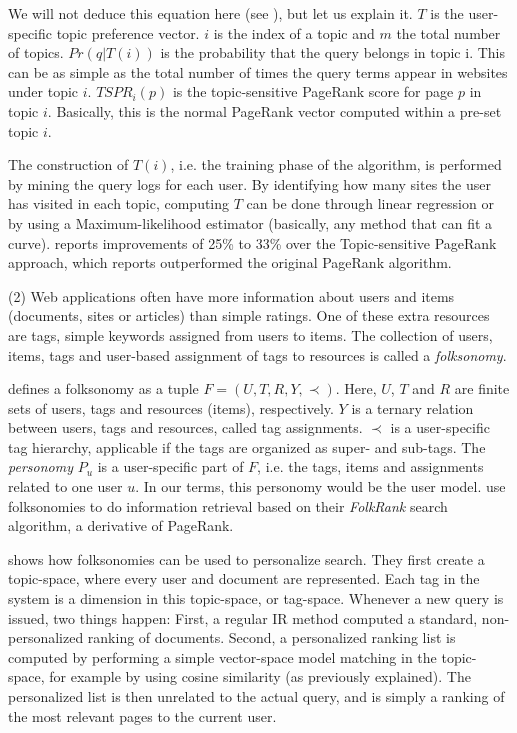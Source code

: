 We will not deduce this equation here (see \citet[p5]{Qiu2006}), but let us explain it. 
$T$ is the user-specific topic preference vector.
$i$ is the index of a topic and $m$ the total number of topics.
$Pr(q|T(i))$ is the probability that the query belongs in topic i.
This can be as simple as the total number of times the query terms appear in websites under topic $i$.
$TSPR_i(p)$ is the topic-sensitive PageRank score for page $p$ in topic $i$. Basically, this is 
the normal PageRank vector computed within a pre-set topic $i$.

The construction of $T(i)$, i.e. the training phase of the algorithm, is performed by mining the query logs for each user.
By identifying how many sites the user has visited in each topic, computing $T$ can be done through linear regression or
by using a Maximum-likelihood estimator (basically, any method that can fit a curve).
\citet[p10]{Qiu2006} reports improvements of 25\% to 33\% over the Topic-sensitive PageRank approach, which 
\citet{Haveliwala2003} reports outperformed the original PageRank algorithm.


(2) Web applications often have more information about users and items (documents, sites or articles) 
than simple ratings. One of these extra resources are tags, simple keywords assigned from users to items. 
The collection of users, items, tags and user-based assignment of tags to resources is called a \emph{folksonomy}.

\cite{Hotho} defines a folksonomy as a tuple $F = (U,T,R,Y,\prec)$. 
Here, $U$, $T$ and $R$ are finite sets of users, tags and resources (items), respectively. 
$Y$ is a ternary relation between users, tags and resources, called tag assignments. 
$\prec$ is a user-specific tag hierarchy, applicable if the tags are organized as super- and sub-tags. 
The \emph{personomy} $P_u$ is a user-specific part of $F$, 
i.e. the tags, items and assignments related to one user $u$. 
In our terms, this personomy would be the user model. 
\citeauthor{Hotho} use folksonomies to do information retrieval based on their 
\emph{FolkRank} search algorithm, a derivative of PageRank. 

\cite{Bao2007} shows how folksonomies can be used to personalize search.
They first create a topic-space, where every user and document are represented.
Each tag in the system is a dimension in this topic-space, or tag-space.
Whenever a new query is issued, two things happen: First, a regular IR method
computed a standard, non-personalized ranking of documents.
Second, a personalized ranking list is computed by performing a simple
vector-space model matching in the topic-space, for example by using
cosine similarity (as previously explained). The personalized list
is then unrelated to the actual query, and is simply a ranking of the
most relevant pages to the current user.

